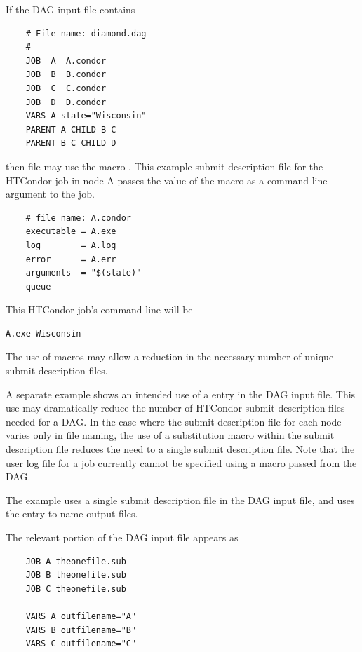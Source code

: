 
If the DAG input file contains
\footnotesize
\begin{verbatim}
    # File name: diamond.dag
    #
    JOB  A  A.condor 
    JOB  B  B.condor 
    JOB  C  C.condor	
    JOB  D  D.condor
    VARS A state="Wisconsin"
    PARENT A CHILD B C
    PARENT B C CHILD D

\end{verbatim}
\normalsize

then file  may use the macro \verb@state@.
This example submit description file for the HTCondor
job in node A passes the value
of the macro as a command-line argument to the job.

\footnotesize
\begin{verbatim}
    # file name: A.condor
    executable = A.exe
    log        = A.log
    error      = A.err
    arguments  = "$(state)"
    queue
\end{verbatim}
\normalsize

This HTCondor job's command line will be
\footnotesize
\begin{verbatim}
A.exe Wisconsin
\end{verbatim}
\normalsize
The use of macros may allow a reduction in the necessary number 
of unique submit description files.

A separate example shows an intended use of a  entry
in the DAG input file.
This use may dramatically reduce the number of HTCondor submit description
files needed for a DAG.
In the case where the submit description file for each node
varies only in file naming, the use of a substitution macro
within the submit description file reduces the need to
a single submit description file.
Note that the user log file for a job currently cannot be specified
using a macro passed from the DAG.

The example uses a single submit description file in the DAG input
file, and uses the  entry to name output files.

The relevant portion of the DAG input file appears as 
\begin{verbatim}
    JOB A theonefile.sub
    JOB B theonefile.sub
    JOB C theonefile.sub

    VARS A outfilename="A"
    VARS B outfilename="B"
    VARS C outfilename="C"
\end{verbatim}

